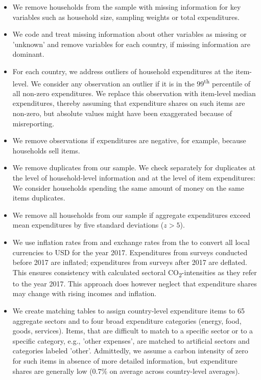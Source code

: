 \documentclass[12pt, a4paper]{article}
\begin{document}
\begin{refsection}
\begin{itemize}
    \item We remove households from the sample with missing information for key variables such as household size, sampling weights or total expenditures.
    \item We code and treat missing information about other variables as missing or 'unknown' and remove variables for each country, if missing information are dominant.
    \item For each country, we address outliers of household expenditures at the item-level. We consider any observation an outlier if it is in the 99\textsuperscript{th} percentile of all non-zero expenditures. We replace this observation with item-level median expenditures, thereby assuming that expenditure shares on such items are non-zero, but absolute values might have been exaggerated because of misreporting.
    \item We remove observations if expenditures are negative, for example, because households sell items.
    \item We remove duplicates from our sample. We check separately for duplicates at the level of household-level information and at the level of item expenditures: We consider households spending the same amount of money on the same items duplicates.
    \item We remove all households from our sample if aggregate expenditures exceed mean expenditures by five standard deviations ($z>5$).
    \item We use inflation rates from \textcite{IMF.2020} and exchange rates from the \textcite{WorldBankGroup.2023} to convert all local currencies to USD for the year 2017. Expenditures from surveys conducted before 2017 are inflated; expenditures from surveys after 2017 are deflated. This ensures consistency with calculated sectoral CO\textsubscript{2}-intensities as they refer to the year 2017. This approach does however neglect that expenditure shares may change with rising incomes and inflation.
    \item We create matching tables to assign country-level expenditure items to 65 aggregate sectors and to four broad expenditure categories (energy, food, goods, services). Items, that are difficult to match to a specific sector or to a specific category, e.g., 'other expenses', are matched to artificial sectors and categories labeled 'other'. Admittedly, we assume a carbon intensity of zero for such items in absence of more detailed information, but expenditure shares are generally low (0.7\% on average across country-level averages). 

\end{itemize}
\end{refsection}
\end{document}
